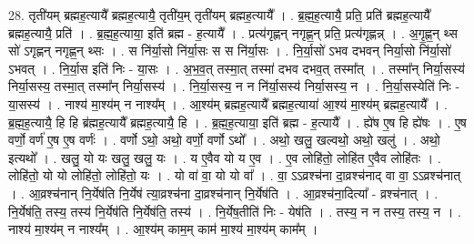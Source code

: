 \documentclass[17pt]{extarticle}
\begin{document}
28. तृती॑यम् ब्रह्मह॒त्यायै᳚ ब्रह्मह॒त्यायै॒ तृती॑य॒म् तृती॑यम् ब्रह्मह॒त्यायै᳚ । . ब्र॒ह्म॒ह॒त्यायै॒ प्रति॒ प्रति॑ ब्रह्मह॒त्यायै᳚ ब्रह्मह॒त्यायै॒ प्रति॑ । . ब्र॒ह्म॒ह॒त्याया॒ इति॑ ब्रह्म - ह॒त्यायै᳚ । . प्रत्य॑गृह्णन् नगृह्ण॒न् प्रति॒ प्रत्य॑गृह्णन्न् । . अ॒गृ॒ह्ण॒न् थ्स सो॑ ऽगृह्णन् नगृह्ण॒न् थ्सः । . स नि॑र्या॒सो नि॑र्या॒सः स स नि॑र्या॒सः । . नि॒र्या॒सो॑ ऽभव दभवन् निर्या॒सो नि॑र्या॒सो॑ ऽभवत् । . नि॒र्या॒स इति॑ निः - या॒सः । . अ॒भ॒व॒त् तस्मा॒त् तस्मा॑ दभव दभव॒त् तस्मा᳚त् । . तस्मा᳚न् निर्या॒सस्य॑ निर्या॒सस्य॒ तस्मा॒त् तस्मा᳚न् निर्या॒सस्य॑ । . नि॒र्या॒सस्य॒ न न नि॑र्या॒सस्य॑ निर्या॒सस्य॒ न । . नि॒र्या॒सस्येति॑ निः - या॒सस्य॑ । . नाश्य॑ मा॒श्य॑म् न नाश्य᳚म् । . आ॒श्य॑म् ब्रह्मह॒त्यायै᳚ ब्रह्मह॒त्याया॑ आ॒श्य॑ मा॒श्य॑म् ब्रह्मह॒त्यायै᳚ । . ब्र॒ह्म॒ह॒त्यायै॒ हि हि ब्र॑ह्मह॒त्यायै᳚ ब्रह्मह॒त्यायै॒ हि । . ब्र॒ह्म॒ह॒त्याया॒ इति॑ ब्रह्म - ह॒त्यायै᳚ । . ह्ये॑ष ए॒ष हि ह्ये॑षः । . ए॒ष वर्णो॒ वर्ण॑ ए॒ष ए॒ष वर्णः॑ । . वर्णो ऽथो॒ अथो॒ वर्णो॒ वर्णो ऽथो᳚ । . अथो॒ खलु॒ खल्वथो॒ अथो॒ खलु॑ । . अथो॒ इत्यथो᳚ । . खलु॒ यो यः खलु॒ खलु॒ यः । . य ए॒वैव यो य ए॒व । . ए॒व लोहि॑तो॒ लोहि॑त ए॒वैव लोहि॑तः । . लोहि॑तो॒ यो यो लोहि॑तो॒ लोहि॑तो॒ यः । . यो वा॑ वा॒ यो यो वा᳚ । . वा॒ ऽऽव्रश्च॑ना दा॒व्रश्च॑नाद् वा वा॒ ऽऽव्रश्च॑नात् । . आ॒व्रश्च॑नान् नि॒र्येष॑ति नि॒र्येष॑ त्या॒व्रश्च॑ना दा॒व्रश्च॑नान् नि॒र्येष॑ति । . आ॒व्रश्च॑ना॒दित्या᳚ - व्रश्च॑नात् । . नि॒र्येष॑ति॒ तस्य॒ तस्य॑ नि॒र्येष॑ति नि॒र्येष॑ति॒ तस्य॑ । . नि॒र्येष॒तीति॑ निः - येष॑ति । . तस्य॒ न न तस्य॒ तस्य॒ न । . नाश्य॑ मा॒श्य॑म् न नाश्य᳚म् । . आ॒श्य॑म् काम॒म् काम॑ मा॒श्य॑ मा॒श्य॑म् काम᳚म् । \newline
\end{document}
